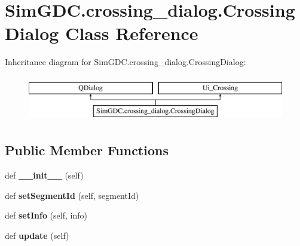 \hypertarget{class_sim_g_d_c_1_1crossing__dialog_1_1_crossing_dialog}{}\section{Sim\+G\+D\+C.\+crossing\+\_\+dialog.\+Crossing\+Dialog Class Reference}
\label{class_sim_g_d_c_1_1crossing__dialog_1_1_crossing_dialog}
Inheritance diagram for Sim\+G\+D\+C.\+crossing\+\_\+dialog.\+Crossing\+Dialog\+:\begin{figure}[H]
\begin{center}
\leavevmode
\includegraphics[height=2.000000cm]{class_sim_g_d_c_1_1crossing__dialog_1_1_crossing_dialog}
\end{center}
\end{figure}
\subsection*{Public Member Functions}
\begin{DoxyCompactItemize}
\item 
\hypertarget{class_sim_g_d_c_1_1crossing__dialog_1_1_crossing_dialog_abbbfbbae8f4ffc477748ca3f78622b04}{}def {\bfseries \+\_\+\+\_\+init\+\_\+\+\_\+} (self)\label{class_sim_g_d_c_1_1crossing__dialog_1_1_crossing_dialog_abbbfbbae8f4ffc477748ca3f78622b04}

\item 
\hypertarget{class_sim_g_d_c_1_1crossing__dialog_1_1_crossing_dialog_aa483443e4bf64167f777c8ff55474bf9}{}def {\bfseries set\+Segment\+Id} (self, segment\+Id)\label{class_sim_g_d_c_1_1crossing__dialog_1_1_crossing_dialog_aa483443e4bf64167f777c8ff55474bf9}

\item 
\hypertarget{class_sim_g_d_c_1_1crossing__dialog_1_1_crossing_dialog_a027c3eb85ab0ee8091895b73aa28b546}{}def {\bfseries set\+Info} (self, info)\label{class_sim_g_d_c_1_1crossing__dialog_1_1_crossing_dialog_a027c3eb85ab0ee8091895b73aa28b546}

\item 
\hypertarget{class_sim_g_d_c_1_1crossing__dialog_1_1_crossing_dialog_ae5fede343a9e0ae3f0ff634a7273bb0f}{}def {\bfseries update} (self)\label{class_sim_g_d_c_1_1crossing__dialog_1_1_crossing_dialog_ae5fede343a9e0ae3f0ff634a7273bb0f}

\end{DoxyCompactItemize}
